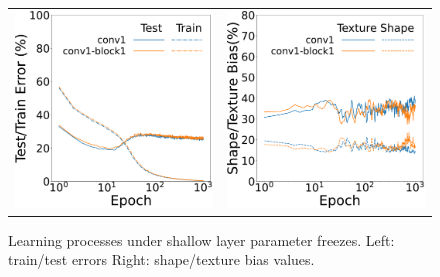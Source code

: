 \begin{figure}[htb]
\centering
   \begin{tabular}{cc}
      \hspace{-5mm}
      \includegraphics[keepaspectratio, width=0.45\linewidth]{fig/frozen_shallow_layer_learning_curv.pdf} &
        \hspace{5pt} 
      \includegraphics[keepaspectratio, width=0.45\linewidth]{fig/frozen_shallow_layer_sha_tex.pdf}
   \end{tabular}
\caption[Learning processes under shallow layer parameter freezes.]{Learning processes under shallow layer parameter freezes. Left: train/test errors Right: shape/texture bias values.}
\label{fig:comp_frozen_shallow_layer}
\end{figure}
\newpage